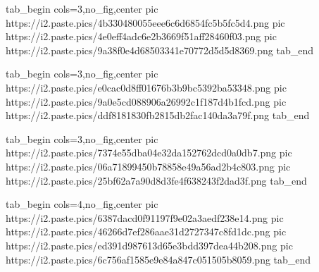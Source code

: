  
 
 
 
 
\zzSecCmtScr

\ifcmt
  tab_begin cols=3,no_fig,center
     pic https://i2.paste.pics/4b330480055eee6c6d6854fc5b5fc5d4.png
     pic https://i2.paste.pics/4e0eff4adc6e2b3669f51aff28460f03.png
     pic https://i2.paste.pics/9a38f0e4d68503341e70772d5d5d8369.png
  tab_end
\fi

\ifcmt
  tab_begin cols=3,no_fig,center
		 pic https://i2.paste.pics/e0cac0d8ff01676b3b9bc5392ba53348.png
		 pic https://i2.paste.pics/9a0e5cd088906a26992c1f187d4b1fcd.png
		 pic https://i2.paste.pics/ddf8181830fb2815db2fac140da3a79f.png
  tab_end
\fi

\ifcmt
  tab_begin cols=3,no_fig,center
		 pic https://i2.paste.pics/7374e55dba04e32da152762dcd0a0db7.png
		 pic https://i2.paste.pics/06a71899450b78858e49a56ad2b4c803.png
		 pic https://i2.paste.pics/25bf62a7a90d8d3fe4f638243f2dad3f.png
  tab_end
\fi

\ifcmt
  tab_begin cols=4,no_fig,center
	   pic https://i2.paste.pics/6387dacd0f91197f9e02a3aedf238e14.png
		 pic https://i2.paste.pics/46266d7ef286aae31d2727347c8fd1dc.png
		 pic https://i2.paste.pics/ed391d987613d65e3bdd397dea44b208.png
		 pic https://i2.paste.pics/6c756af1585e9e84a847c051505b8059.png
  tab_end
\fi
